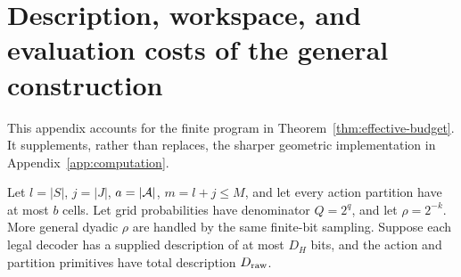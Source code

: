 \section{Description, workspace, and evaluation costs of the general construction}\label{app:finite-description}
This appendix accounts for the finite program in Theorem~\ref{thm:effective-budget}. It supplements, rather than replaces, the sharper geometric implementation in Appendix~\ref{app:computation}.

Let $l=|S|$, $j=|J|$, $a=|\mathcal A|$, $m=l+j\le M$, and let every action partition have at most $b$ cells. Let grid probabilities have denominator $Q=2^q$, and let $\rho=2^{-k}$. More general dyadic $\rho$ are handled by the same finite-bit sampling. Suppose each legal decoder has a supplied description of at most $D_H$ bits, and the action and partition primitives have total description $D_{\rm raw}$.

